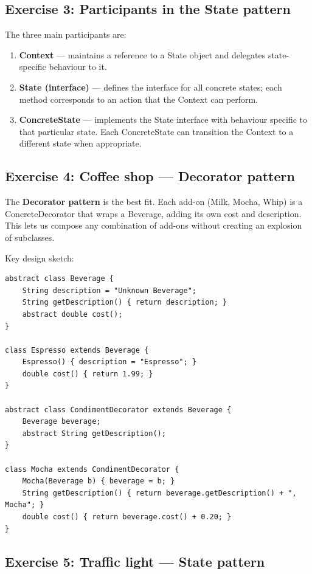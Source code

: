 \documentclass[twoside=false,DIV=14]{scrartcl}
\begin{document}
\subsection*{Exercise 3: Participants in the State pattern}

The three main participants are:
\begin{enumerate}
    \item \textbf{Context} --- maintains a reference to a State object and delegates state-specific behaviour to it.
    \item \textbf{State (interface)} --- defines the interface for all concrete states; each method corresponds to an action that the Context can perform.
    \item \textbf{ConcreteState} --- implements the State interface with behaviour specific to that particular state.  Each ConcreteState can transition the Context to a different state when appropriate.
\end{enumerate}

\subsection*{Exercise 4: Coffee shop --- Decorator pattern}

The \textbf{Decorator pattern} is the best fit.  Each add-on (Milk, Mocha, Whip) is a ConcreteDecorator that wraps a Beverage, adding its own cost and description.  This lets us compose any combination of add-ons without creating an explosion of subclasses.

Key design sketch:
\begin{lstlisting}
abstract class Beverage {
    String description = "Unknown Beverage";
    String getDescription() { return description; }
    abstract double cost();
}

class Espresso extends Beverage {
    Espresso() { description = "Espresso"; }
    double cost() { return 1.99; }
}

abstract class CondimentDecorator extends Beverage {
    Beverage beverage;
    abstract String getDescription();
}

class Mocha extends CondimentDecorator {
    Mocha(Beverage b) { beverage = b; }
    String getDescription() { return beverage.getDescription() + ", Mocha"; }
    double cost() { return beverage.cost() + 0.20; }
}
\end{lstlisting}

\subsection*{Exercise 5: Traffic light --- State pattern}
\end{document}
